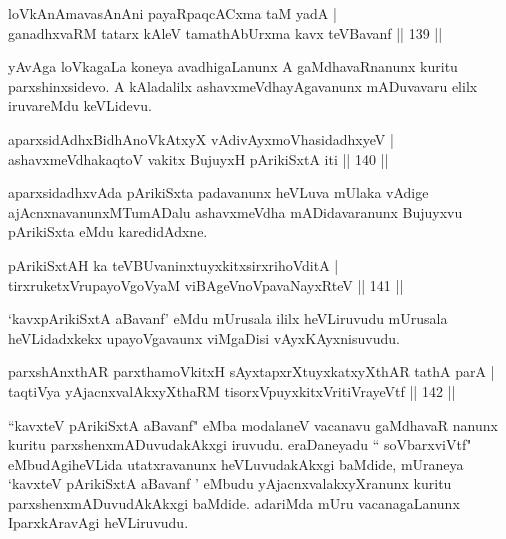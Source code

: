 \begin{shl}
loVkAnAmavasAnAni payaRpaqcACxma taM yadA |\\
ganadhxvaRM tatarx kAleV tamathAbUrxma kavx teV\s Bavanf \hfill || 139 ||
\end{shl}

\begin{artha}
yAvAga loVkagaLa koneya avadhigaLanunx A gaMdhavaRnanunx kuritu parxshinxsidevo. A kAladalilx ashavxmeVdhayAgavanunx mADuvavaru elilx iruvareMdu keVLidevu.
\end{artha}

\begin{shl}
aparxsidAdhxBidhAnoVkAtxyX vAdivAyxmoVhasidadhxyeV |\\
ashavxmeVdhakaqtoV vakitx BujuyxH pArikiSxtA iti \hfill || 140 ||
\end{shl}

\begin{artha}
aparxsidadhxvAda pArikiSxta padavanunx heVLuva mUlaka vAdige ajAcnxnavanunxMTumADalu ashavxmeVdha mADidavaranunx Bujuyxvu pArikiSxta eMdu karedidAdxne.
\end{artha}


\begin{shl}
pArikiSxtAH ka teV\s BUvaninxtuyxkitxsirxrihoVditA |\\
tirxruketxVrupayoVgoV\s yaM viBAgeVnoVpavaNayxRteV \hfill || 141 ||
\end{shl}

\begin{artha}
`kavxpArikiSxtA aBavanf' eMdu mUrusala ililx heVLiruvudu mUrusala heVLidadxkekx upayoVgavaunx viMgaDisi vAyxKAyxnisuvudu.
\end{artha}

\begin{shl}
parxshAnxthAR parxthamoVkitxH sAyxtapxrXtuyxkatxyXthAR tathA parA |\\
taqtiVya yAjacnxvalAkxyXthaRM tisorxV\s puyxkitxVritiVrayeVtf \hfill || 142 ||
\end{shl}

\begin{artha}
``kavxteV pArikiSxtA aBavanf" eMba modalaneV vacanavu gaMdhavaR nanunx kuritu parxshenxmADuvudakAkxgi iruvudu. eraDaneyadu `` soV\s barxviVtf" eMbudAgiheVLida utatxravanunx heVLuvudakAkxgi baMdide, mUraneya `kavxteV pArikiSxtA aBavanf ' eMbudu yAjacnxvalakxyXranunx kuritu parxshenxmADuvudAkAkxgi baMdide. adariMda mUru vacanagaLanunx IparxkAravAgi heVLiruvudu.
\end{artha}

